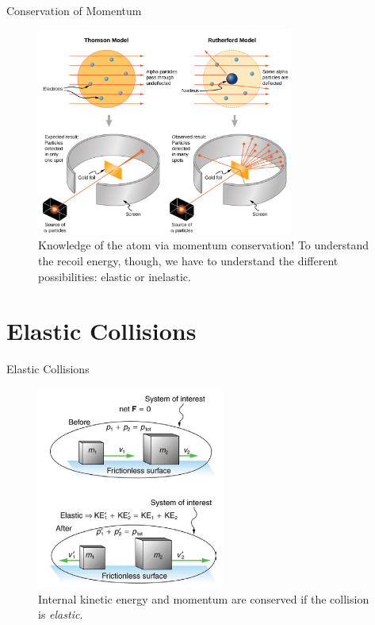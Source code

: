 \documentclass{beamer}
\begin{document}
\begin{frame}{Conservation of Momentum}
\begin{figure}
\centering
\includegraphics[width=0.75\textwidth]{figures/alpha.png}
\caption{\label{fig:alpha} Knowledge of the atom via momentum conservation! To understand the recoil energy, though, we have to understand the different possibilities: elastic or inelastic.}
\end{figure}
\end{frame}

\section{Elastic Collisions}

\begin{frame}{Elastic Collisions}
\begin{figure}
\centering
\includegraphics[width=0.55\textwidth]{figures/elastic.png}
\caption{\label{fig:elastic} \small Internal kinetic energy and momentum are conserved if the collision is \textit{elastic}.}
\end{figure}
\end{frame}
\end{document}

